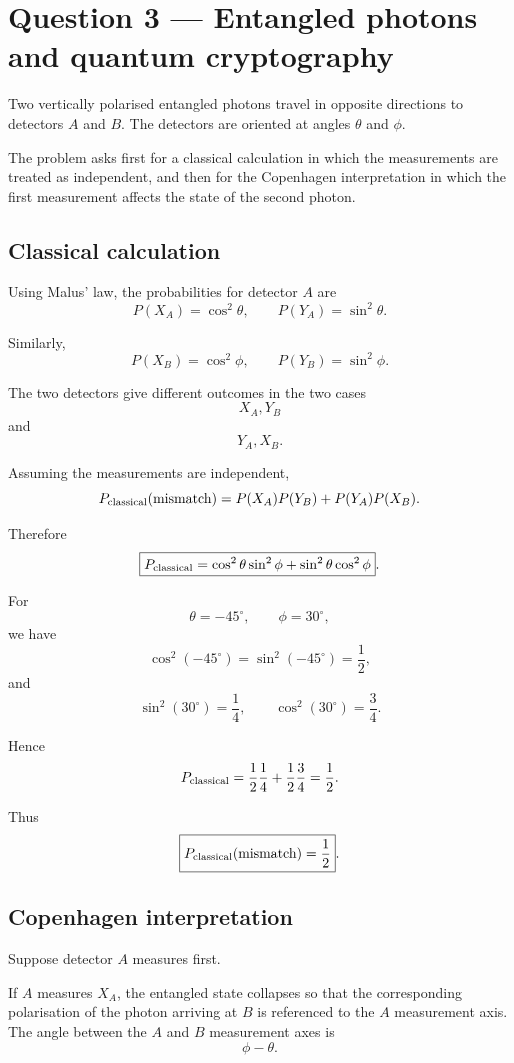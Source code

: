 \documentclass[11pt,a4paper]{article}
\begin{document}
\section{Question 3 --- Entangled photons and quantum cryptography}

Two vertically polarised entangled photons travel in opposite directions to
detectors $A$ and $B$. The detectors are oriented at angles $\theta$ and $\phi$.

The problem asks first for a classical calculation in which the measurements are
treated as independent, and then for the Copenhagen interpretation in which the
first measurement affects the state of the second photon.

\subsection{Classical calculation}

Using Malus' law, the probabilities for detector $A$ are
\[
P(X_A)=\cos^2\theta,
\qquad
P(Y_A)=\sin^2\theta.
\]

Similarly,
\[
P(X_B)=\cos^2\phi,
\qquad
P(Y_B)=\sin^2\phi.
\]

The two detectors give different outcomes in the two cases
\[
X_A,Y_B
\]
and
\[
Y_A,X_B.
\]

Assuming the measurements are independent,
\[
P_{\rm classical}(\mathrm{mismatch})
=
P(X_A)P(Y_B)+P(Y_A)P(X_B).
\]

Therefore
\[
\boxed{
P_{\rm classical}
=
\cos^2\theta\sin^2\phi
+
\sin^2\theta\cos^2\phi
}.
\]

For
\[
\theta=-45^\circ,
\qquad
\phi=30^\circ,
\]
we have
\[
\cos^2(-45^\circ)=\sin^2(-45^\circ)=\frac12,
\]
and
\[
\sin^2(30^\circ)=\frac14,
\qquad
\cos^2(30^\circ)=\frac34.
\]

Hence
\[
P_{\rm classical}
=
\frac12\frac14
+
\frac12\frac34
=
\frac12.
\]

Thus
\[
\boxed{P_{\rm classical}(\mathrm{mismatch})=\frac12}.
\]

\subsection{Copenhagen interpretation}

Suppose detector $A$ measures first.

If $A$ measures $X_A$, the entangled state collapses so that the corresponding
polarisation of the photon arriving at $B$ is referenced to the $A$ measurement
axis. The angle between the $A$ and $B$ measurement axes is
\[
\phi-\theta.
\]
\end{document}
